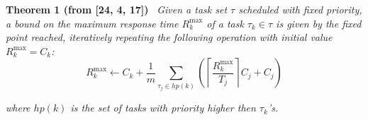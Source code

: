 \textbf{Theorem 1 (from [24, 4, 17])} \ \textit{Given a task set $\tau$ scheduled with fixed priority, a bound on the maximum response time $R_k^{\max}$ of a task $\tau_k \in \tau$ is given by the fixed point reached, iteratively repeating the following operation with initial value $R_k^{\max} = C_k$:}
\[
R_k^{\max} \leftarrow C_k + \frac{1}{m} \sum_{\tau_j \in hp(k)}
\left(
\left\lceil \frac{R_k^{\max}}{T_j} \right\rceil C_j + C_j
\right)
\tag{2}
\]

\noindent
\textit{where $hp(k)$ is the set of tasks with priority higher then $\tau_k$'s.}